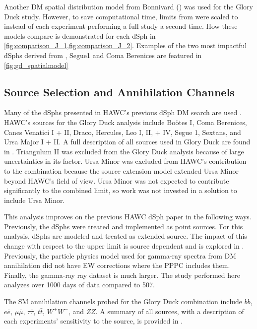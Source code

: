 Another DM spatial distribution model from Bonnivard (\B) \cite{Bonnivard:2014kza} was used for the Glory Duck study.
However, to save computational time, limits from \GS were scaled to \B instead of each experiment performing a full study a second time.
How these models compare is demonstrated for each dSph in \cref{fig:comparison_J_1,fig:comparison_J_2}.
Examples of the two most impactful dSphs derived from \GS, Segue1 and Coma Berenices are featured in \cref{fig:gd_spatialmodel}

\subsection{Source Selection and Annihilation Channels}\label{sec:gd_srcs_y_chan}

Many of the dSphs presented in HAWC's previous dSph DM search are used \cite{Albert_2018}.
HAWC's sources for the Glory Duck analysis include Boötes I, Coma Berenices, Canes Venatici I + II, Draco, Hercules, Leo I, II, + IV, Segue 1, Sextans, and Ursa Major I + II.
A full description of all sources used in Glory Duck are found in .
Triangulum II was excluded from the Glory Duck analysis because of large uncertainties in its \J factor.
Ursa Minor was excluded from HAWC's contribution to the combination because the source extension model extended Ursa Minor beyond HAWC's field of view.
Ursa Minor was not expected to contribute significantly to the combined limit, so work was not invested in a solution to include Ursa Minor.

This analysis improves on the previous HAWC dSph paper \cite{Albert_2018} in the following ways.
Previously, the dSphs were treated and implemented as point sources.
For this analysis, dSphs are modeled and treated as extended source.
The impact of this change with respect to the upper limit is source dependent and is explored in .
Previously, the particle physics model used for gamma-ray spectra from DM annihilation did not have EW corrections where the PPPC includes them.
Finally, the gamma-ray ray dataset is much larger.
The study performed here analyzes over 1000 days of data compared to 507.

The SM annihilation channels probed for the Glory Duck combination include $b\bar{b}$, $e\bar{e}$, $\mu\bar{\mu}$, $\tau\bar{\tau}$, $t\bar{t}$, $W^+W^-$, and $ZZ$.
A summary of all sources, with a description of each experiments' sensitivity to the source, is provided in .

